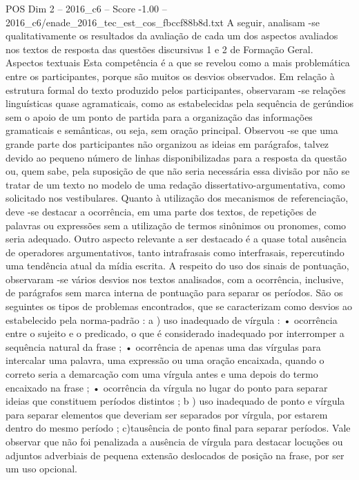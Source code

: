 \begin{textsample}{POS Dim 2 – 2016\_c6 – Score -1.00 – 2016\_c6/enade\_2016\_tec\_est\_cos\_fbccf88b8d.txt}
A seguir, analisam -se qualitativamente os resultados da avaliação de cada um dos aspectos avaliados nos textos de resposta das questões discursivas 1 e 2 de Formação Geral.
Aspectos textuais Esta competência é a que se revelou como a mais problemática entre os participantes, porque são muitos os desvios observados.
Em relação à estrutura formal do texto produzido pelos participantes, observaram -se relações linguísticas quase agramaticais, como as estabelecidas pela sequência de gerúndios sem o apoio de um ponto de partida para a organização das informações gramaticais e semânticas, ou seja, sem oração principal.
Observou -se que uma grande parte dos participantes não organizou as ideias em parágrafos, talvez devido ao pequeno número de linhas disponibilizadas para a resposta da questão ou, quem sabe, pela suposição de que não seria necessária essa divisão por não se tratar de um texto no modelo de uma redação dissertativo-argumentativa, como solicitado nos vestibulares.
Quanto à utilização dos mecanismos de referenciação, deve -se destacar a ocorrência, em uma parte dos textos, de repetições de palavras ou expressões sem a utilização de termos sinônimos ou pronomes, como seria adequado.
Outro aspecto relevante a ser destacado é a quase total ausência de operadores argumentativos, tanto intrafrasais como interfrasais, repercutindo uma tendência atual da mídia escrita.
A respeito do uso dos sinais de pontuação, observaram -se vários desvios nos textos analisados, com a ocorrência, inclusive, de parágrafos sem marca interna de pontuação para separar os períodos.
São os seguintes os tipos de problemas encontrados, que se caracterizam como desvios ao estabelecido pela norma-padrão : a ) uso inadequado de vírgula : • ocorrência entre o sujeito e o predicado, o que é considerado inadequado por interromper a sequência natural da frase ; • ocorrência de apenas uma das vírgulas para intercalar uma palavra, uma expressão ou uma oração encaixada, quando o correto seria a demarcação com uma vírgula antes e uma depois do termo encaixado na frase ; • ocorrência da vírgula no lugar do ponto para separar ideias que constituem períodos distintos ; b ) uso inadequado de ponto e vírgula para separar elementos que deveriam ser separados por vírgula, por estarem dentro do mesmo período ; c)tausência de ponto final para separar períodos.
Vale observar que não foi penalizada a ausência de vírgula para destacar locuções ou adjuntos adverbiais de pequena extensão deslocados de posição na frase, por ser um uso opcional.

\end{textsample}
